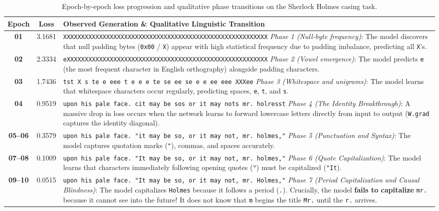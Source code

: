 \documentclass[../../main.tex]{subfiles}
\begin{document}
\begin{table}[htbp]
\centering
\small
\caption{Epoch-by-epoch loss progression and qualitative phase transitions on the Sherlock Holmes casing task.}
\label{tab:sherlock_epochs}
\begin{tabularx}{\textwidth}{c c X}
\toprule
\textbf{Epoch} & \textbf{Loss} & \textbf{Observed Generation \& Qualitative Linguistic Transition} \\
\midrule
\textbf{01} & 3.1681 & \texttt{XXXXXXXXXXXXXXXXXXXXXXXXXXXXXXXXXXXXXXXXXXXXXXXXXXXXXXXXX} \newline \emph{Phase 1 (Null-byte frequency)}: The model discovers that null padding bytes (\texttt{0x00} / \texttt{X}) appear with high statistical frequency due to padding imbalance, predicting all \texttt{X}'s. \\
\midrule
\textbf{02} & 2.3334 & \texttt{eXXXXXXXXXXXXXXXXXXXXXXXXXXXXXXXXXXXXXXXXXXXXXXXXXXXXXXXX} \newline \emph{Phase 2 (Vowel emergence)}: The model predicts \texttt{e} (the most frequent character in English orthography) alongside padding characters. \\
\midrule
\textbf{03} & 1.7436 & \texttt{tst X s te e eee t e e e te se ee se e e ee eee XXXee} \newline \emph{Phase 3 (Whitespace and unigrams)}: The model learns that whitespace characters occur regularly, predicting spaces, \texttt{e}, \texttt{t}, and \texttt{s}. \\
\midrule
\textbf{04} & 0.9519 & \texttt{upon his pale face. cit may be sos or it may nots mr. holresst} \newline \emph{Phase 4 (The Identity Breakthrough)}: A massive drop in loss occurs when the network learns to forward lowercase letters directly from input to output (\texttt{W.grad} captures the identity diagonal). \\
\midrule
\textbf{05--06} & 0.3579 & \texttt{upon his pale face. "it may be so, or it may not, mr. holmes,"} \newline \emph{Phase 5 (Punctuation and Syntax)}: The model captures quotation marks (\texttt{"}), commas, and spaces accurately. \\
\midrule
\textbf{07--08} & 0.1009 & \texttt{upon his pale face. "It may be so, or it may not, mr. holmes,"} \newline \emph{Phase 6 (Quote Capitalization)}: The model learns that characters immediately following opening quotes (\texttt{"}) must be capitalized (\texttt{"It}). \\
\midrule
\textbf{09--10} & 0.0515 & \texttt{upon his pale face. "It may be so, or it may not, mr. Holmes,"} \newline \emph{Phase 7 (Period Capitalization and Causal Blindness)}: The model capitalizes \texttt{Holmes} because it follows a period (\texttt{.}). Crucially, the model \textbf{fails to capitalize} \texttt{mr.} because it cannot see into the future! It does not know that \texttt{m} begins the title \texttt{Mr.} until the \texttt{r.} arrives. \\
\bottomrule
\end{tabularx}
\end{table}
\end{document}
